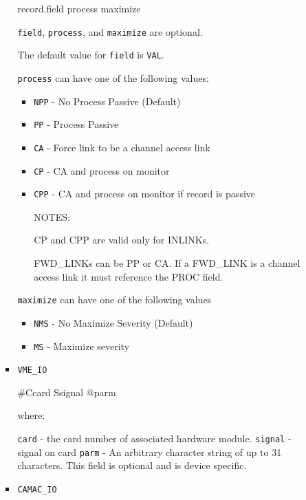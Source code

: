 \begin{itemize}
\begin{itemize}
\begin{itemize}
    record.field process maximize


\verb|field|, \verb|process|, and \verb|maximize| are optional. 

The default value for \verb|field| is \verb|VAL|.

\verb|process| can have one of the following values:

\begin{itemize}

\item \verb|NPP| - No Process Passive (Default)

\item \verb|PP| - Process Passive

\item \verb|CA| - Force link to be a channel access link

\item \verb|CP| - CA and process on monitor

\item \verb|CPP| - CA and process on monitor if record is passive

NOTES:

CP and CPP are valid only for INLINKs.

FWD\_LINKs can be PP or CA. If a FWD\_LINK is a channel access link it must reference the 
PROC field.

\end{itemize}

\verb|maximize| can have one of the following values

\begin{itemize}

\item \verb|NMS| - No Maximize Severity (Default)

\item \verb|MS| - Maximize severity

\end{itemize}

\item \verb|VME_IO|

\#Ccard Ssignal @parm

where:

\verb|card| - the card number of associated hardware module.
\verb|signal| - signal on card
\verb|parm| - An arbitrary character string of up to 31 characters. This field is optional and is device specific.

\item \verb|CAMAC_IO|


\end{itemize}
\end{itemize}
\end{itemize}
